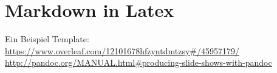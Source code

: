 \chapter{Markdown in Latex}

Ein Beispiel Template: \url{https://www.overleaf.com/12101678hfzyntdmtzsy#/45957179/}
\url{http://pandoc.org/MANUAL.html#producing-slide-shows-with-pandoc}